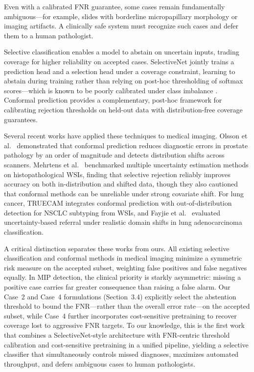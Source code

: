 Even with a calibrated FNR guarantee, some cases remain fundamentally
ambiguous---for example, slides with borderline micropapillary morphology
or imaging artifacts. A clinically safe system must recognize such cases
and defer them to a human pathologist.

Selective classification \cite{hendrickx2024survey} enables a model to
abstain on uncertain inputs, trading coverage for higher reliability on
accepted cases. SelectiveNet \cite{geifman2019selectivenet} jointly trains
a prediction head and a selection head under a coverage constraint, learning
to abstain during training rather than relying on post-hoc thresholding of
softmax scores---which is known to be poorly calibrated under class
imbalance \cite{hendrycks2016baseline}. Conformal prediction
\cite{angelopoulos2022conformal} provides a complementary, post-hoc
framework for calibrating rejection thresholds on held-out data with
distribution-free coverage guarantees.

Several recent works have applied these techniques to medical imaging.
Olsson et al.\ \cite{olsson2022estimating} demonstrated that conformal
prediction reduces diagnostic errors in prostate pathology by an order of
magnitude and detects distribution shifts across scanners. Mehrtens et al.\
\cite{mehrtens2023benchmarking,mehrtens2025pitfalls} benchmarked multiple
uncertainty estimation methods on histopathological WSIs, finding that
selective rejection reliably improves accuracy on both in-distribution and
shifted data, though they also cautioned that conformal methods can be
unreliable under strong covariate shift. For lung cancer, TRUECAM
\cite{zhang2024truecam} integrates conformal prediction with
out-of-distribution detection for NSCLC subtyping from WSIs, and Fayjie
et al.\ \cite{fayjie2024predictive} evaluated uncertainty-based referral
under realistic domain shifts in lung adenocarcinoma classification.

A critical distinction separates these works from ours. All existing
selective classification and conformal methods in medical imaging minimize
a symmetric risk measure on the accepted subset, weighting false positives
and false negatives equally. In MIP detection, the clinical priority is
starkly asymmetric: missing a positive case carries far greater consequence
than raising a false alarm. Our Case~2 and Case~4 formulations
(Section~3.4) explicitly select the abstention threshold to bound the
FNR---rather than the overall error rate---on the accepted subset, while
Case~4 further incorporates cost-sensitive pretraining to recover coverage
lost to aggressive FNR targets. To our knowledge, this is the first work
that combines a SelectiveNet-style architecture with FNR-centric threshold
calibration and cost-sensitive pretraining in a unified pipeline, yielding
a selective classifier that simultaneously controls missed diagnoses,
maximizes automated throughput, and defers ambiguous cases to human
pathologists.


